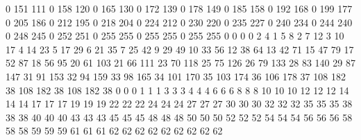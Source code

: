0 151 111 0 158 120 0 165 130 0 172 139 0 178 149 0 185 158 0 192 168 0 199 177 0 205 186 0 212 195 0 218 204 0 224 212 0 230 220 0 235 227 0 240 234 0 244 240 0 248 245 0 252 251 0 255 255 0 255 255 0 255 255 0 0 0 0 2 4 1 5 8 2 7 12 3 10 17 4 14 23 5 17 29 6 21 35 7 25 42 9 29 49 10 33 56 12 38 64 13 42 71 15 47 79 17 52 87 18 56 95 20 61 103 21 66 111 23 70 118 25 75 126 26 79 133 28 83 140 29 87 147 31 91 153 32 94 159 33 98 165 34 101 170 35 103 174 36 106 178 37 108 182 38 108 182 38 108 182 38 0 0 0 1 1 1 3 3 3 4 4 4 6 6 6 8 8 8 10 10 10 12 12 12 14 14 14 17 17 17 19 19 19 22 22 22 24 24 24 27 27 27 30 30 30 32 32 32 35 35 35 38 38 38 40 40 40 43 43 43 45 45 45 48 48 48 50 50 50 52 52 52 54 54 54 56 56 56 58 58 58 59 59 59 61 61 61 62 62 62 62 62 62 62 62 62
